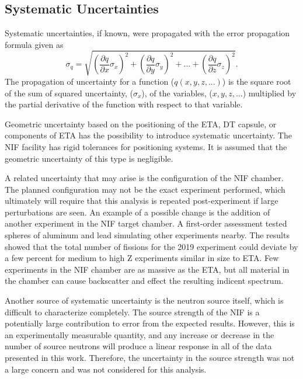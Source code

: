 \subsection{Systematic Uncertainties} \label{section1}

Systematic uncertainties, if known, were propagated with the error propagation formula given as
\begin{equation} \label{eq:errprop}
\sigma_{q} = \sqrt{(\dfrac{\partial q}{\partial x} \sigma_{x} )^2+(\dfrac{\partial q}{\partial y} \sigma_{y} )^2+ ... +(\dfrac{\partial q}{\partial z} \sigma_{z} )^2}.
\end{equation}
\noindent The propagation of uncertainty for a function ($q(x,y,z,...)$) is the square root of the sum of squared uncertainty, ($\sigma_{x}$), of the variables, ($x, y, z,...$) multiplied by the partial derivative of the function with respect to that variable\cite{Taylor}. 

Geometric uncertainty based on the positioning of the ETA, DT capsule, or components of ETA has the possibility to introduce systematic uncertainty. 
The NIF facility has rigid tolerances for positioning systems. 
It is assumed that the geometric uncertainty of this type is negligible.

A related uncertainty that may arise is the configuration of the NIF chamber. 
The planned configuration may not be the exact experiment performed, which ultimately will require that this analysis is repeated post-experiment if large perturbations are seen. 
An example of a possible change is the addition of another experiment in the NIF target chamber. 
A first-order assessment tested spheres of aluminum and lead simulating other experiments nearby. 
The results showed that the total number of fissions for the 2019 experiment could deviate by a few percent for medium to high Z experiments similar in size to ETA. 
Few experiments in the NIF chamber are as massive as the ETA, but all material in the chamber can cause backscatter and effect the resulting indicent spectrum. 

Another source of systematic uncertainty is the neutron source itself, which is difficult to characterize completely. 
The source strength of the NIF is a potentially large contribution to error from the expected results.
However, this is an experimentally measurable quantity, and any increase or decrease in the number of source neutrons will produce a linear response in all of the data presented in this work. 
Therefore, the uncertainty in the source strength was not a large concern and was not considered for this analysis. 

